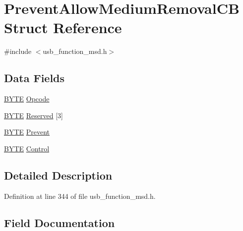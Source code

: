 \hypertarget{struct_prevent_allow_medium_removal_c_b}{}\section{Prevent\+Allow\+Medium\+Removal\+C\+B Struct Reference}
\label{struct_prevent_allow_medium_removal_c_b}


{\ttfamily \#include $<$usb\+\_\+function\+\_\+msd.\+h$>$}

\subsection*{Data Fields}
\begin{DoxyCompactItemize}
\item 
\hyperlink{_generic_type_defs_8h_a4ae1dab0fb4b072a66584546209e7d58}{B\+Y\+T\+E} \hyperlink{struct_prevent_allow_medium_removal_c_b_a3ac7536b907732d60214ae553910eed9}{Opcode}
\item 
\hyperlink{_generic_type_defs_8h_a4ae1dab0fb4b072a66584546209e7d58}{B\+Y\+T\+E} \hyperlink{struct_prevent_allow_medium_removal_c_b_a14c783327ec2051ddb5c5aa057f58ec3}{Reserved} \mbox{[}3\mbox{]}
\item 
\hyperlink{_generic_type_defs_8h_a4ae1dab0fb4b072a66584546209e7d58}{B\+Y\+T\+E} \hyperlink{struct_prevent_allow_medium_removal_c_b_a52ce51e48dc896df5ef43858f6068fb2}{Prevent}
\item 
\hyperlink{_generic_type_defs_8h_a4ae1dab0fb4b072a66584546209e7d58}{B\+Y\+T\+E} \hyperlink{struct_prevent_allow_medium_removal_c_b_a5dc24656c27deb12af74c98930f0bfc5}{Control}
\end{DoxyCompactItemize}


\subsection{Detailed Description}


Definition at line 344 of file usb\+\_\+function\+\_\+msd.\+h.



\subsection{Field Documentation}
\hypertarget{struct_prevent_allow_medium_removal_c_b_a5dc24656c27deb12af74c98930f0bfc5}{}
